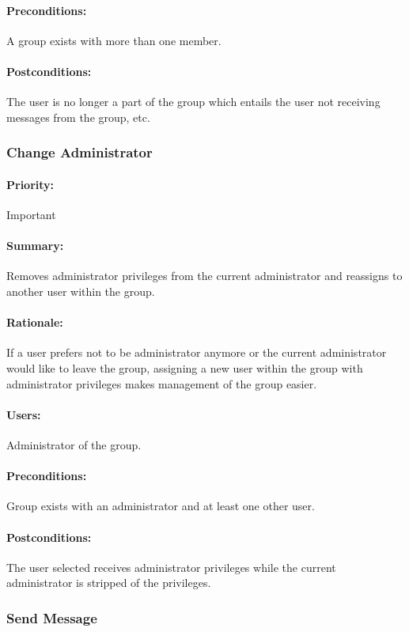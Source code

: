\documentclass[11pt]{article}
\begin{document}
\paragraph{Preconditions:}
A group exists with more than one member.
\paragraph{{Postconditions:}}
The user is no longer a part of the group which entails the user not receiving messages from the group, etc.
\subsubsection{Change Administrator} \label{UC-change-admin}
\paragraph{Priority:} Important
\paragraph{Summary:}
Removes administrator privileges from the current administrator and reassigns to another user within the group.
\paragraph{Rationale:}
If a user prefers not to be administrator anymore or the current administrator would like to leave the group, assigning a new user within the group with administrator privileges makes management of the group easier.
\paragraph{Users:}
Administrator of the group.
\paragraph{Preconditions:}
Group exists with an administrator and at least one other user.
\paragraph{{Postconditions:}}
The user selected receives administrator privileges while the current administrator is stripped of the privileges.
\subsubsection{Send Message} \label{UC-send-message}
\end{document}
